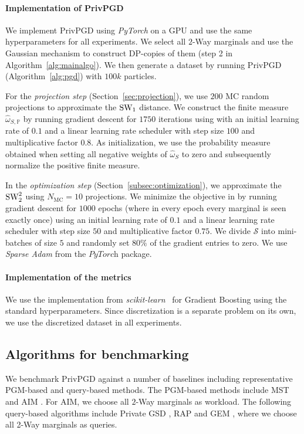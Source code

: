  




  \paragraph{Implementation of PrivPGD}
 We implement PrivPGD using \textit{PyTorch} on a GPU and use the same hyperparameters for all experiments. We select all $2$-Way marginals and use the Gaussian mechanism to construct DP-copies of them  (step 2 in Algorithm~\ref{alg:mainalgo}). We then generate a dataset by running PrivPGD (Algorithm~\ref{alg:pgd}) with  $100k$ particles. 


 
 For the \emph{projection step} (Section~\ref{sec:projection}), we use $200$ MC random projections to approximate the $\text{SW}_1$ distance. We construct the finite measure $ \hat \omega_{S, \mathbb P}$ by running gradient descent for $1750$ iterations using  with an initial learning rate of $0.1$ and a linear learning rate scheduler with step size $100$ and multiplicative factor $0.8$. As initialization, we use the probability measure obtained when setting all negative weights of $\hat \omega_{S}$ to zero and subsequently normalize the positive finite measure. 

 
In the \emph{optimization step} (Section~\ref{subsec:optimization}), we  approximate the $\text{SW}^2_2$ using $N_{\text{MC}} =10$ projections. We minimize the objective in  by running gradient descent for $1000$ epochs (where in every epoch every marginal is seen exactly once) using an initial learning rate of $0.1$ and a linear learning rate scheduler with step size $50$ and multiplicative factor $0.75$. We divide $\mathcal S$ into mini-batches of size $5$ and randomly set $80\%$ of the gradient entries to zero. We use \textit{Sparse Adam} from the $\textit{PyTorch}$ package.

\paragraph{Implementation of the metrics} We use the implementation from \textit{scikit-learn}~\citep{sklearn_api} for Gradient Boosting using the standard hyperparameters. Since discretization is a separate problem on its own, we use the discretized dataset in all experiments. 

\subsection{Algorithms for benchmarking}
\label{sec:algorithms}
We benchmark PrivPGD against a number of baselines including representative PGM-based and query-based methods. The PGM-based methods include MST \citep{mst} and AIM \cite{aim}. For AIM, we choose all $2$-Way marginals as workload. The following query-based algorithms include Private GSD \citep{pmlr-v202-liu23ag}, RAP \cite{aydore2021differentially} and GEM \citep{liu2021iterative}, where we choose all 2-Way marginals as queries. 

